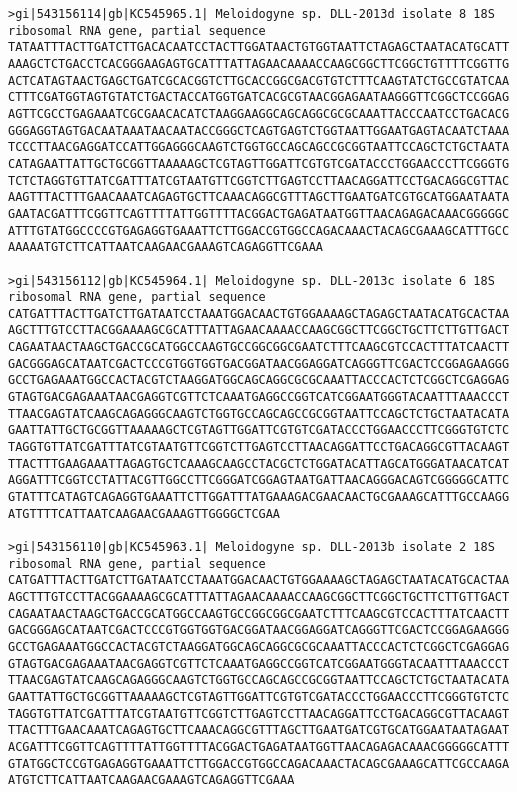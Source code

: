 \documentclass[11pt]{article}
\begin{document}
\begin{Verbatim}[commandchars=\\\{\}]
>gi|543156114|gb|KC545965.1| Meloidogyne sp. DLL-2013d isolate 8 18S ribosomal RNA gene, partial sequence
TATAATTTACTTGATCTTGACACAATCCTACTTGGATAACTGTGGTAATTCTAGAGCTAATACATGCATT
AAAGCTCTGACCTCACGGGAAGAGTGCATTTATTAGAACAAAACCAAGCGGCTTCGGCTGTTTTCGGTTG
ACTCATAGTAACTGAGCTGATCGCACGGTCTTGCACCGGCGACGTGTCTTTCAAGTATCTGCCGTATCAA
CTTTCGATGGTAGTGTATCTGACTACCATGGTGATCACGCGTAACGGAGAATAAGGGTTCGGCTCCGGAG
AGTTCGCCTGAGAAATCGCGAACACATCTAAGGAAGGCAGCAGGCGCGCAAATTACCCAATCCTGACACG
GGGAGGTAGTGACAATAAATAACAATACCGGGCTCAGTGAGTCTGGTAATTGGAATGAGTACAATCTAAA
TCCCTTAACGAGGATCCATTGGAGGGCAAGTCTGGTGCCAGCAGCCGCGGTAATTCCAGCTCTGCTAATA
CATAGAATTATTGCTGCGGTTAAAAAGCTCGTAGTTGGATTCGTGTCGATACCCTGGAACCCTTCGGGTG
TCTCTAGGTGTTATCGATTTATCGTAATGTTCGGTCTTGAGTCCTTAACAGGATTCCTGACAGGCGTTAC
AAGTTTACTTTGAACAAATCAGAGTGCTTCAAACAGGCGTTTAGCTTGAATGATCGTGCATGGAATAATA
GAATACGATTTCGGTTCAGTTTTATTGGTTTTACGGACTGAGATAATGGTTAACAGAGACAAACGGGGGC
ATTTGTATGGCCCCGTGAGAGGTGAAATTCTTGGACCGTGGCCAGACAAACTACAGCGAAAGCATTTGCC
AAAAATGTCTTCATTAATCAAGAACGAAAGTCAGAGGTTCGAAA

>gi|543156112|gb|KC545964.1| Meloidogyne sp. DLL-2013c isolate 6 18S ribosomal RNA gene, partial sequence
CATGATTTACTTGATCTTGATAATCCTAAATGGACAACTGTGGAAAAGCTAGAGCTAATACATGCACTAA
AGCTTTGTCCTTACGGAAAAGCGCATTTATTAGAACAAAACCAAGCGGCTTCGGCTGCTTCTTGTTGACT
CAGAATAACTAAGCTGACCGCATGGCCAAGTGCCGGCGGCGAATCTTTCAAGCGTCCACTTTATCAACTT
GACGGGAGCATAATCGACTCCCGTGGTGGTGACGGATAACGGAGGATCAGGGTTCGACTCCGGAGAAGGG
GCCTGAGAAATGGCCACTACGTCTAAGGATGGCAGCAGGCGCGCAAATTACCCACTCTCGGCTCGAGGAG
GTAGTGACGAGAAATAACGAGGTCGTTCTCAAATGAGGCCGGTCATCGGAATGGGTACAATTTAAACCCT
TTAACGAGTATCAAGCAGAGGGCAAGTCTGGTGCCAGCAGCCGCGGTAATTCCAGCTCTGCTAATACATA
GAATTATTGCTGCGGTTAAAAAGCTCGTAGTTGGATTCGTGTCGATACCCTGGAACCCTTCGGGTGTCTC
TAGGTGTTATCGATTTATCGTAATGTTCGGTCTTGAGTCCTTAACAGGATTCCTGACAGGCGTTACAAGT
TTACTTTGAAGAAATTAGAGTGCTCAAAGCAAGCCTACGCTCTGGATACATTAGCATGGGATAACATCAT
AGGATTTCGGTCCTATTACGTTGGCCTTCGGGATCGGAGTAATGATTAACAGGGACAGTCGGGGGCATTC
GTATTTCATAGTCAGAGGTGAAATTCTTGGATTTATGAAAGACGAACAACTGCGAAAGCATTTGCCAAGG
ATGTTTTCATTAATCAAGAACGAAAGTTGGGGCTCGAA

>gi|543156110|gb|KC545963.1| Meloidogyne sp. DLL-2013b isolate 2 18S ribosomal RNA gene, partial sequence
CATGATTTACTTGATCTTGATAATCCTAAATGGACAACTGTGGAAAAGCTAGAGCTAATACATGCACTAA
AGCTTTGTCCTTACGGAAAAGCGCATTTATTAGAACAAAACCAAGCGGCTTCGGCTGCTTCTTGTTGACT
CAGAATAACTAAGCTGACCGCATGGCCAAGTGCCGGCGGCGAATCTTTCAAGCGTCCACTTTATCAACTT
GACGGGAGCATAATCGACTCCCGTGGTGGTGACGGATAACGGAGGATCAGGGTTCGACTCCGGAGAAGGG
GCCTGAGAAATGGCCACTACGTCTAAGGATGGCAGCAGGCGCGCAAATTACCCACTCTCGGCTCGAGGAG
GTAGTGACGAGAAATAACGAGGTCGTTCTCAAATGAGGCCGGTCATCGGAATGGGTACAATTTAAACCCT
TTAACGAGTATCAAGCAGAGGGCAAGTCTGGTGCCAGCAGCCGCGGTAATTCCAGCTCTGCTAATACATA
GAATTATTGCTGCGGTTAAAAAGCTCGTAGTTGGATTCGTGTCGATACCCTGGAACCCTTCGGGTGTCTC
TAGGTGTTATCGATTTATCGTAATGTTCGGTCTTGAGTCCTTAACAGGATTCCTGACAGGCGTTACAAGT
TTACTTTGAACAAATCAGAGTGCTTCAAACAGGCGTTTAGCTTGAATGATCGTGCATGGAATAATAGAAT
ACGATTTCGGTTCAGTTTTATTGGTTTTACGGACTGAGATAATGGTTAACAGAGACAAACGGGGGCATTT
GTATGGCTCCGTGAGAGGTGAAATTCTTGGACCGTGGCCAGACAAACTACAGCGAAAGCATTCGCCAAGA
ATGTCTTCATTAATCAAGAACGAAAGTCAGAGGTTCGAAA


\end{Verbatim}
\end{document}
